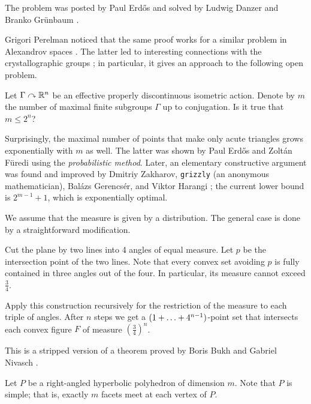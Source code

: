 The problem was posted by Paul Erdős \cite{erdos}
and solved by Ludwig Danzer and Branko Grünbaum \cite{danzer-gruenbaum}.

Grigori Perelman noticed that the same proof works for a similar problem in Alexandrov spaces \cite{perelman-Erdos}.
The latter led to interesting connections with the crystallographic groups \cite{lebedeva};
in particular, it gives an approach to the following open problem.

\begin{pr}
Let $\Gamma\curvearrowright\mathbb{R}^n$ be an effective properly discontinuous isometric action.
Denote by $m$ the number of maximal finite subgroups $\Gamma$ up to conjugation. 
Is it true that $m\le 2^n$?
\end{pr}


Surprisingly, the maximal number of points that make only acute triangles grows exponentially with $m$ as well.
The latter was shown by Paul Erdős and Zolt\'an Füredi \cite{erdos-fueredi} using the \emph{probabilistic method}.
Later, an elementary constructive argument was found and improved by Dmitriy Zakharov,
\texttt{grizzly} (an anonymous mathematician),
Bal{\'a}zs Gerencs{\'e}r, and Viktor Harangi
\cite{zakharov,grizzly,gerencser-harangi};
the current lower bound is $2^{m-1}+1$, which is exponentially optimal.

We assume that the measure is given by a distribution.
The general case is done by a straightforward modification.

Cut the plane by two lines into 4 angles of equal measure.
Let $p$ be the intersection point of the two lines.
Note that every convex set avoiding $p$ is fully contained in three angles out of the four.
In particular, its measure cannot exceed $\tfrac34$.

Apply this construction recursively for the restriction of the measure to each triple of angles.
After $n$ steps we get a $(1+\z\dots+4^{n-1})$-point set 
that intersects each convex figure $F$ of measure $(\tfrac34)^n$.
\qeds

This is a stripped version of a theorem proved by Boris Bukh and Gabriel Nivasch \cite{bukh-nivasch}.

Let $P$ be a right-angled hyperbolic polyhedron of dimension $m$.
Note that $P$ is simple; 
that is, exactly $m$ facets meet at each vertex of $P$.

